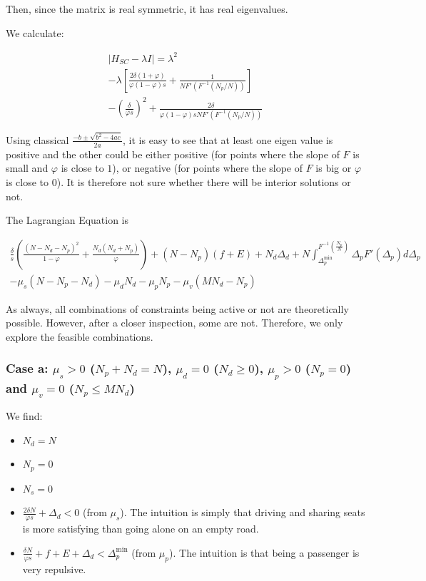 \documentclass[english, a4paper]{article}
\theoremstyle{plain}
\theoremstyle{definition}
\theoremstyle{remark}
\begin{document}
    Then, since the matrix is real symmetric, it has real eigenvalues.

    We calculate:

    \begin{multline}
        \left| H_{SC} - \lambda I \right| = \lambda^2\\
        -\lambda \left[ \frac{2\delta (1 + \varphi)}{\varphi (1 - \varphi ) s} + \frac{1}{NF'\left( F^{-1}\left( N_p/N \right) \right)} \right]\\
        - \left( \frac{\delta}{\varphi s}\right)^2 + \frac{2\delta}{\varphi (1 -\varphi) s N F'(F^{-1}(N_p / N))}
    \end{multline}

    Using classical $\frac{-b \pm \sqrt{b^2 - 4 ac}}{2a}$, it is easy to see that at least one eigen value is positive and the other could be either positive (for points where the slope of $F$ is small and $\varphi$ is close to $1$), or negative (for points where the slope of $F$ is big or $\varphi$ is close to $0$). It is therefore not sure whether there will be interior solutions or not.
    
    The Lagrangian Equation is 

    \begin{multline}
        \frac{\delta}{s} \left ( \frac{(N - N_d - N_p)^2}{1- \varphi} + \frac{N_d(N_d + N_p)}{\varphi} \right)
        + (N - N_p) (f+E)
        + N_d \Delta_d + N \int_{\Delta_p^{\text{min}}}^{F^{-1} \left ( \frac{N_p}{N} \right)} \Delta_p F'(\Delta_p) d\Delta_p\\
        -\mu_s(N - N_p - N_d) - \mu_d N_d - \mu_p N_p - \mu_v(MN_d - N_p)
    \end{multline}

    As always, all combinations of constraints being active or not are theoretically possible. However, after a closer inspection, some are not. Therefore, we only explore the feasible combinations.


    \subsubsection{Case a: $\mu_s > 0$ ($N_p + N_d = N$), $\mu_d = 0$ ($N_d \geq 0$), $\mu_p > 0$ ($N_p = 0$) and $\mu_v = 0$ ($N_p \leq MN_d$)}

    We find:

    \begin{itemize}
        \item $N_d = N$
        \item $N_p = 0$
        \item $N_s = 0$
        \item $\frac{2\delta N}{\varphi s} + \Delta_d < 0$ (from $\mu_s$). The intuition is simply that driving and sharing seats is more satisfying than going alone on an empty road.
        \item $\frac{\delta N}{\varphi s} + f + E + \Delta_d < \Delta_p^{\text{min}}$ (from $\mu_p$). The intuition is that being a passenger is very repulsive.
    \end{itemize}
\end{document}
